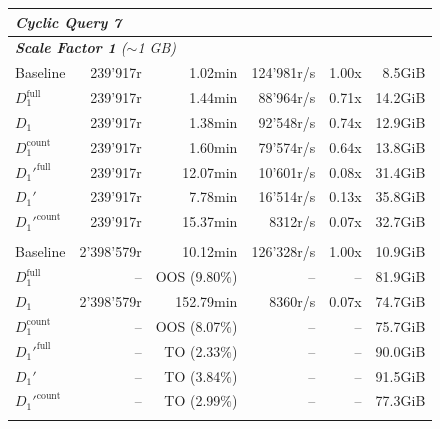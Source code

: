 \begin{longtable}{lrrrrr}
    \multicolumn{6}{l}{\textit{Cyclic Query 7}} \\
    \midrule
    \multicolumn{6}{l}{\textit{\textbf{Scale Factor 1} ($\sim$1 GB)}} \\
    \nopagebreak
    Baseline              &  239'917r             &  1.02min             &  124'981r/s          & 1.00x             & 8.5GiB    \\
    $D_1^{\text{full}}$   &  239'917r             &  1.44min             &  88'964r/s           & 0.71x             & 14.2GiB   \\
    \quad $D_1$           &  239'917r             &  1.38min             &  92'548r/s           & 0.74x             & 12.9GiB   \\
    $D_1^{\text{count}}$  &  239'917r             &  1.60min             &  79'574r/s           & 0.64x             & 13.8GiB   \\
    $D_1'^{\text{full}}$  &  239'917r             &  12.07min            &  10'601r/s           & 0.08x             & 31.4GiB   \\
    \quad $D_1'$          &  239'917r             &  7.78min             &  16'514r/s           & 0.13x             & 35.8GiB   \\
    $D_1'^{\text{count}}$ &  239'917r             &  15.37min            &  8312r/s             & 0.07x             & 32.7GiB   \\
    \addlinespace
    
    \multicolumn{6}{l}{\textit{\textbf{Scale Factor 10} ($\sim$10 GB)}} \\
    \nopagebreak
    Baseline              &  2'398'579r           &  10.12min            &  126'328r/s          & 1.00x             & 10.9GiB   \\
    $D_1^{\text{full}}$   &  --                   &  OOS (9.80\%)        &  --                  & --                & 81.9GiB   \\
    \quad $D_1$           &  2'398'579r           &  152.79min           &  8360r/s             & 0.07x             & 74.7GiB   \\
    $D_1^{\text{count}}$  &  --                   &  OOS (8.07\%)        &  --                  & --                & 75.7GiB   \\
    $D_1'^{\text{full}}$  &  --                   &  TO (2.33\%)         &  --                  & --                & 90.0GiB   \\
    \quad $D_1'$          &  --                   &  TO (3.84\%)         &  --                  & --                & 91.5GiB   \\
    $D_1'^{\text{count}}$ &  --                   &  TO (2.99\%)         & --                   & --                & 77.3GiB   \\
    \addlinespace


\end{longtable}
